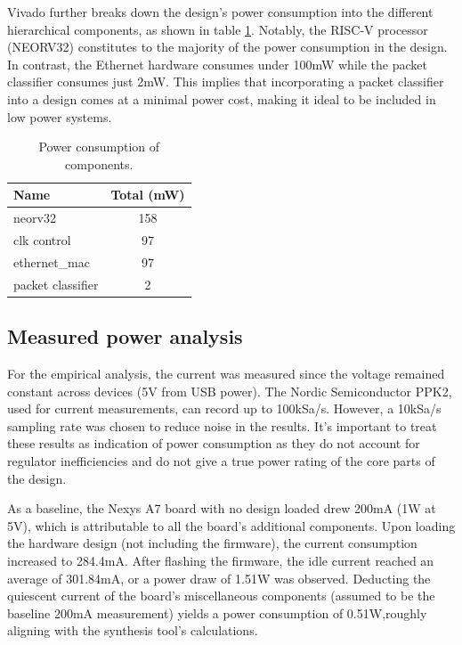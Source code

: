 Vivado further breaks down the design's power consumption into the different hierarchical components, as shown in table \ref{tab:power_consumption}. Notably, the RISC-V processor (NEORV32) constitutes to the majority of the power consumption in the design. In contrast, the Ethernet hardware consumes under 100mW while the packet classifier consumes just 2mW. This implies that incorporating a packet classifier into a design comes at a minimal power cost, making it ideal to be included in low power systems. 


\begin{table}[h]
    \centering
    \caption{Power consumption of components.}
    \begin{tabular}{lc}
        \toprule
        Name & Total (mW) \\
        \midrule
        neorv32 & 158 \\
        clk control & 97 \\
        ethernet\_mac & 97 \\
        packet classifier & 2 \\
        \bottomrule
    \end{tabular}
    \label{tab:power_consumption}
\end{table}



\subsection{Measured power analysis}

For the empirical analysis, the current was measured since the voltage remained constant across devices (5V from USB power). The Nordic Semiconductor PPK2, used for current measurements, can record up to 100kSa/s. However, a 10kSa/s sampling rate was chosen to reduce noise in the results. It's important to treat these results as indication of power consumption as they do not account for regulator inefficiencies and do not give a true power rating of the core parts of the design. 

As a baseline, the Nexys A7 board with no design loaded drew 200mA (1W at 5V), which is attributable to all the board's additional components. Upon loading the hardware design (not including the firmware), the current consumption increased to 284.4mA. After flashing the firmware, the idle current reached an average of 301.84mA, or a power draw of 1.51W was observed. Deducting the quiescent current of the board's miscellaneous components (assumed to be the baseline 200mA measurement) yields a power consumption of 0.51W,roughly aligning with the synthesis tool's calculations.










